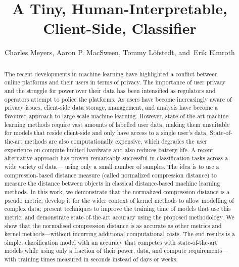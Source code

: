 \documentclass[preprint,12pt]{article}
\begin{document}
\title{A Tiny, Human-Interpretable, Client-Side, Classifier}


\author{Charles Meyers, Aaron P. MacSween, Tommy L\"{o}fstedt, and~Erik Elmroth}

\maketitle


\begin{abstract}
The recent developments in machine learning have highlighted a conflict between online platforms and their users in terms of privacy. 
The importance of user privacy and the struggle for power over their data has been intensified as regulators and operators attempt to police the platforms.
As users have become increasingly aware of privacy issues, client-side data storage, management, and analysis have become a favoured approach to large-scale machine learning.
However, state-of-the-art machine learning methods require vast amounts of labelled user data, making them unsuitable for models that reside client-side and only have access to a single user's data.
State-of-the-art methods are also computationally expensive, which degrades the user experience on compute-limited hardware and also reduces battery life.
A recent alternative approach has proven remarkably successful in classification tasks across a wide variety of data--- using only a small number of samples. 
The idea is to use a compression-based distance measure (called normalized compression distance) to measure the distance between objects in classical distance-based machine learning methods.
In this work, we demonstrate that the normalized compression distance is a pseudo metric; develop it for the wider context of kernel methods to allow modelling of complex data; present techniques to improve the training time of models that use this metric; and demonstrate state-of-the-art accuracy using the proposed methodology.
We show that the normalised compression distance is as accurate as other metrics and kernel methods---without incurring additional computational costs.
The end results is a simple, classification model with an accuracy that competes with state-of-the-art models while using only a fraction of their power, data, and compute requirements---with training times measured in seconds instead of days or weeks.
\end{abstract}
\end{document}
